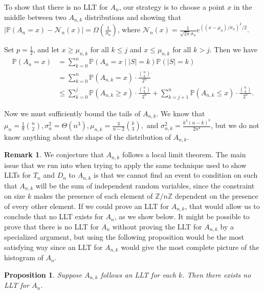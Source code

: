 \documentclass[12pt]{article} %
\newcommand{\abs}[1]{\left\lvert#1\right\rvert}
\renewcommand{\P}{\mathbb{P}}
\newcommand{\Z}{\mathbb{Z}}
\newtheorem{prop}[thm]{Proposition}
\theoremstyle{definition}
\theoremstyle{definition}
\newtheorem{remark}[thm]{Remark}
\begin{document}
To show that there is no LLT for $A_n$, our strategy is to choose a point $x$ in the middle between two $A_{n,k}$ distributions and showing that $\abs{\P(A_n = x) - \mathcal{N}_n(x)} = \Omega(\frac{1}{\sigma_n})$, where $\mathcal{N}_n(x) = \frac{1}{\sqrt{2\pi}\sigma_n} e^{((x-\mu_n)/\sigma_n)^{2}/2}$. 

Set $p = \frac{1}{2}$, and let $x \geq \mu_{n,k}$ for all $k \leq j$ and $x \leq \mu_{n,k}$ for all $k>j$. Then we have
\begin{align*}
\P(A_n = x) &= \sum_{k = 0}^n \P(A_n = x \mid |S| = k)\P(|S| = k)\\
&= \sum_{k = 0}^n \P(A_{n,k} = x) \cdot \frac{{n\choose k}}{2^n} \\
&\leq \sum_{k = 0}^j \P(A_{n,k} \geq x) \cdot \frac{{n\choose k}}{2^n} + \sum_{k = j+1}^n \P(A_{n,k} \leq x) \cdot \frac{{n\choose k}}{2^n}.
\end{align*}

Now we must sufficiently bound the tails of $A_{n,k}$. We know that $\mu_{n} = \frac{1}{8}{n\choose 2}, \sigma_{n}^2 = \Theta(n^3), \mu_{n,k} = \frac{3}{n-2} {k\choose 3}, \text{ and } \sigma_{n,k}^2 = \frac{k^3(n-k)^3}{2n^4}$, but we do not know anything about the shape of the distribution of $A_{n,k}$. 

\begin{remark}
We conjecture that $A_{n,k}$ follows a local limit theorem. The main issue that we run into when trying to apply the same technique used to show LLTs for $T_n$ and $D_n$ to $A_{n,k}$ is that we cannot find an event to condition on such that $A_{n,k}$ will be the sum of independent random variables, since the constraint on size $k$ makes the presence of each element of $\Z/n\Z$ dependent on the presence of every other element. If we could prove an LLT for $A_{n,k}$, that would allow us to conclude that no LLT exists for $A_n$, as we show below. It might be possible to prove that there is no LLT for $A_n$ without proving the LLT for $A_{n,k}$ by a specialized argument, but using the following proposition would be the most satisfying way since an LLT for $A_{n,k}$ would give the most complete picture of the histogram of $A_n$.
\end{remark}

\begin{prop}
Suppose $A_{n,k}$ follows an LLT for each $k$. Then there exists no LLT for $A_n$.
\end{prop}
\end{document}
